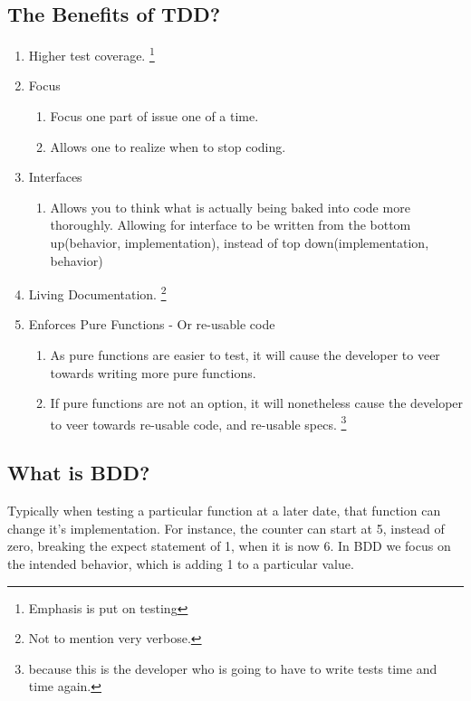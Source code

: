 \subsection{ The Benefits of TDD? }
\begin{enumerate}
  \item Higher test coverage. \footnote{Emphasis is put on testing}
  \item Focus
    \begin{enumerate}
      \item Focus one part of issue one of a time.
      \item Allows one to realize when to stop coding.
    \end{enumerate}
  \item Interfaces
    \begin{enumerate}
      \item Allows you to think what is actually being baked into code more
      thoroughly. Allowing for interface to be written from the bottom
      up(behavior, implementation), instead of top down(implementation,
      behavior)
    \end{enumerate}
  \item Living Documentation. \footnote{Not to mention very verbose.}
  \item Enforces Pure Functions - Or re-usable code
    \begin{enumerate}
      \item As pure functions are easier to test, it will cause the developer
      to veer towards writing more pure functions.
      \item If pure functions are not an option, it will nonetheless cause the
      developer to veer towards re-usable code, and re-usable specs. \footnote{
      because this is the developer who is going to have to write tests time
      and time again.
      }
    \end{enumerate}
\end{enumerate}

\subsection{ What is BDD? }
Typically when testing a particular function at a later date, that function can
change it's implementation. For instance, the counter can start at 5, instead of
zero, breaking the expect statement of 1, when it is now 6. In BDD we focus on
the intended behavior, which is adding 1 to a particular value.

